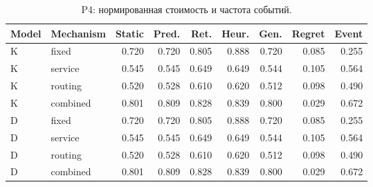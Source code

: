 \begin{table}[htbp]\caption{P4: нормированная стоимость и частота событий.}\centering\small\setlength{\tabcolsep}{3pt}

\begin{tabular}{llrrrrrrr}\toprule

Model & Mechanism & Static & Pred. & Ret. & Heur. & Gen. & Regret & Event\\\midrule

K & fixed & 0.720 & 0.720 & 0.805 & 0.888 & 0.720 & 0.085 & 0.255\\

K & service & 0.545 & 0.545 & 0.649 & 0.649 & 0.544 & 0.105 & 0.564\\

K & routing & 0.520 & 0.528 & 0.610 & 0.620 & 0.512 & 0.098 & 0.490\\

K & combined & 0.801 & 0.809 & 0.828 & 0.839 & 0.800 & 0.029 & 0.672\\

D & fixed & 0.720 & 0.720 & 0.805 & 0.888 & 0.720 & 0.085 & 0.255\\

D & service & 0.545 & 0.545 & 0.649 & 0.649 & 0.544 & 0.105 & 0.564\\

D & routing & 0.520 & 0.528 & 0.610 & 0.620 & 0.512 & 0.098 & 0.490\\

D & combined & 0.801 & 0.809 & 0.828 & 0.839 & 0.800 & 0.029 & 0.672\\

\bottomrule\end{tabular}\end{table}

